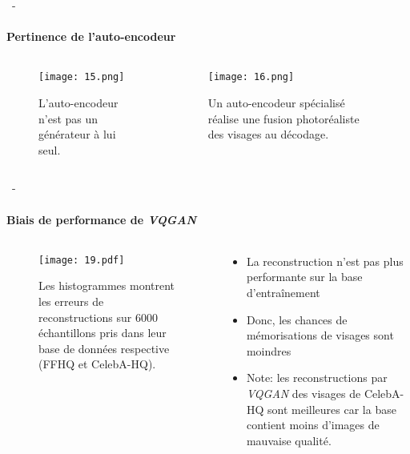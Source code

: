 \documentclass[aspectratio=169, 22pt]{beamer}
\begin{document}
\begin{frame}{\secname~- \subsecname}
  \framesubtitle{Pertinence de l'auto-encodeur}
  \begin{columns}
    \begin{column}{0.4\linewidth}
      \begin{figure}
        \texttt{[image: 15.png]}
        \caption{L'auto-encodeur n'est pas un générateur à lui seul.}
      \end{figure}
    \end{column}
    \begin{column}{0.6\linewidth}
      \begin{figure}
        \texttt{[image: 16.png]}
        \caption{Un auto-encodeur spécialisé réalise une fusion photoréaliste des visages au décodage.}
      \end{figure}
    \end{column}
  \end{columns}
\end{frame}

\begin{frame}{\secname~- \subsecname}
  \framesubtitle{Biais de performance de \emph{VQGAN}}
  \begin{columns}
    \begin{column}{0.5\linewidth}
      \begin{figure}
        \texttt{[image: 19.pdf]}
        \caption{Les histogrammes montrent les erreurs de reconstructions sur
        6000 échantillons pris dans leur base de données respective (FFHQ et CelebA-HQ).}
      \end{figure}
    \end{column}
    \begin{column}{0.5\linewidth}
      \begin{itemize}
      \item La reconstruction n'est pas plus performante sur la base d'entraînement
      \item Donc, les chances de mémorisations de visages sont moindres
      \item {\small Note: les reconstructions par \emph{VQGAN} des visages de
        CelebA-HQ sont meilleures car la base contient moins d'images de
        mauvaise qualité.}
      \end{itemize}
    \end{column}
  \end{columns}
\end{frame}
\end{document}
